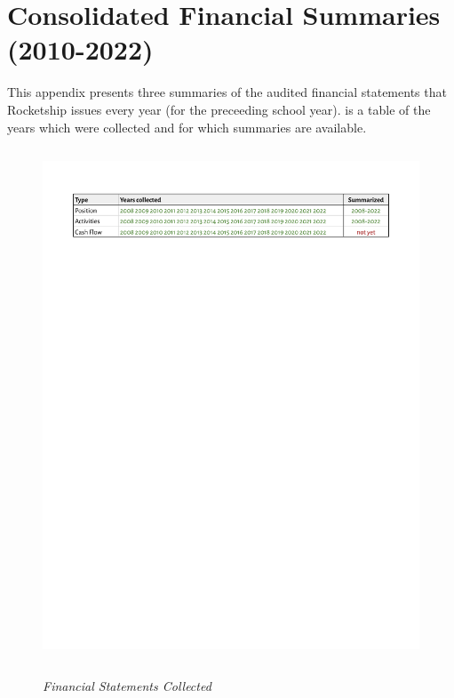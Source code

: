 
\chapter{Consolidated Financial Summaries (2010-2022)}\label{ch:consolidated_financial_summaries}\indent

This appendix presents three summaries of the audited financial statements that Rocketship issues every year (for the preceeding school year).  is a table of the years which were collected and for which summaries are available.

\begin{figure}[hb]
  \caption[Financial Statements Collected ]{\textit{Financial Statements Collected}}
  \label{fig:financial-statements-collected} %
  \vspace{-0.4in}
  \includegraphics[height=6in]{Consolidated_Financial_Statements/Financial_Statements_Collected.pdf}\\
\end{figure}

